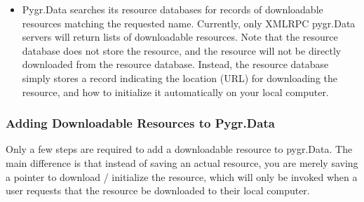 \documentclass{howto}
\begin{document}
\begin{itemize}
\item Pygr.Data searches its resource databases for records
of downloadable resources matching the requested name.  
Currently, only XMLRPC pygr.Data servers will return
lists of downloadable resources.  Note that the resource
database does not store the resource, and the resource will not
be directly downloaded from the resource database.  Instead,
the resource database simply stores a record indicating the location
(URL) for downloading the resource, and how to initialize it
automatically on your local computer.

\end{itemize}

\subsubsection{Adding Downloadable Resources to Pygr.Data}
Only a few steps are required to add a downloadable resource
to pygr.Data.  The main difference is that instead of saving an
actual resource, you are merely saving a pointer to download / 
initialize the resource, which will only be invoked when a user
requests that the resource be downloaded to their local computer.
\end{document}
